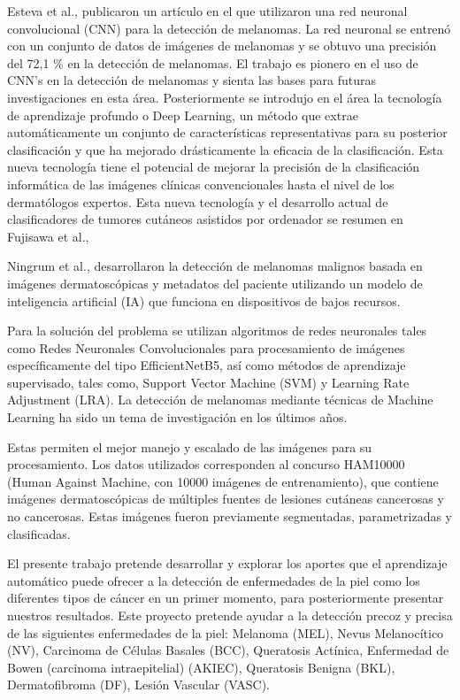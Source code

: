 Esteva et al., %
publicaron un artículo en el que utilizaron una red neuronal convolucional (CNN) para la detección de melanomas. 
La red neuronal se entrenó con un conjunto de datos de imágenes de melanomas y se obtuvo una precisión del 72,1 \% en la detección de melanomas. 
El trabajo es pionero en el uso de CNN's en la detección de melanomas y sienta las bases para futuras investigaciones en esta área. 
Posteriormente se introdujo en el área la tecnología de aprendizaje profundo o Deep Learning, un método que extrae automáticamente un conjunto de características representativas para su posterior clasificación y que ha mejorado drásticamente la eficacia de la clasificación. 
Esta nueva tecnología tiene el potencial de mejorar la precisión de la clasificación informática de las imágenes clínicas convencionales hasta el nivel de los dermatólogos expertos. 
Esta nueva tecnología y el desarrollo actual de clasificadores de tumores cutáneos asistidos por ordenador se resumen en Fujisawa et al., %

Ningrum et al., %
desarrollaron la detección de melanomas malignos basada en imágenes dermatoscópicas y metadatos del paciente utilizando un modelo de inteligencia artificial (IA) que funciona en dispositivos de bajos recursos. 

Para la solución del problema se utilizan algoritmos de redes neuronales tales como Redes Neuronales Convolucionales para procesamiento de imágenes específicamente del tipo EfficientNetB5, así como métodos de aprendizaje supervisado, tales como, Support Vector Machine (SVM) y Learning Rate Adjustment (LRA). 
La detección de melanomas mediante técnicas de Machine Learning ha sido un tema de investigación en los últimos años.

Estas permiten el mejor manejo y escalado de las imágenes para su procesamiento. Los datos utilizados corresponden al concurso HAM10000 (Human Against Machine, con 10000 imágenes de entrenamiento), que contiene imágenes dermatoscópicas de múltiples fuentes de lesiones cutáneas cancerosas y no cancerosas. 
Estas imágenes fueron previamente segmentadas, parametrizadas y clasificadas.

El presente trabajo pretende desarrollar y explorar los aportes que el aprendizaje automático puede ofrecer a la detección de enfermedades de la piel como los diferentes tipos de cáncer en un primer momento, para posteriormente presentar nuestros resultados. 
Este proyecto pretende ayudar a la detección precoz y precisa de las siguientes enfermedades de la piel: Melanoma (MEL), Nevus Melanocítico (NV), Carcinoma de Células Basales (BCC), Queratosis Actínica, Enfermedad de Bowen (carcinoma intraepitelial) (AKIEC), Queratosis Benigna (BKL), Dermatofibroma (DF), Lesión Vascular (VASC).

